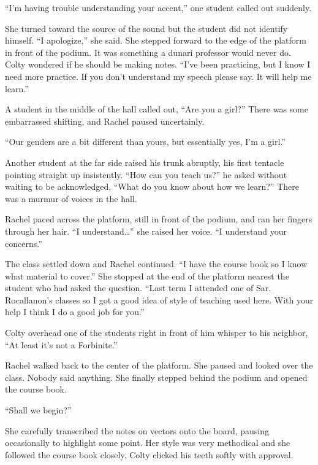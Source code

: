 ``I'm having trouble understanding your accent,'' one student called out suddenly.

She turned toward the source of the sound but the student did not identify himself. ``I
apologize,'' she said. She stepped forward to the edge of the platform in front of the podium.
It was something a dunari professor would never do. Colty wondered if he should be making notes.
``I've been practicing, but I know I need more practice. If you don't understand my speech
please say. It will help me learn.''


A student in the middle of the hall called out, ``Are you a girl?'' There was some embarrassed
shifting, and Rachel paused uncertainly.

``Our genders are a bit different than yours, but essentially yes, I'm a girl.''

Another student at the far side raised his trunk abruptly, his first tentacle pointing straight
up insistently. ``How can you teach us?'' he asked without waiting to be acknowledged, ``What do
you know about how we learn?'' There was a murmur of voices in the hall.

Rachel paced across the platform, still in front of the podium, and ran her fingers through her
hair. ``I understand\ldots'' she raised her voice. ``I understand your concerns.''

The class settled down and Rachel continued. ``I have the course book so I know what material to
cover.'' She stopped at the end of the platform nearest the student who had asked the question.
``Last term I attended one of Sar. Rocallanon's classes so I got a good idea of style of
teaching used here. With your help I think I do a good job for you.''

Colty overhead one of the students right in front of him whisper to his neighbor, ``At least
it's not a Forbinite.''

Rachel walked back to the center of the platform. She paused and looked over the class. Nobody
said anything. She finally stepped behind the podium and opened the course book.

``Shall we begin?''

She carefully transcribed the notes on vectors onto the board, pausing occasionally to highlight
some point. Her style was very methodical and she followed the course book closely. Colty
clicked his teeth softly with approval.

